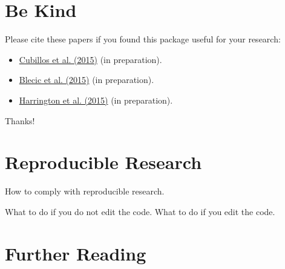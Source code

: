 \documentclass[letterpaper, 12pt]{article}
\begin{document}
\section{Be Kind}
\label{sec:bekind}
Please cite these papers if you found this package useful for your
research:
\begin{itemize}
\item \href{https://github.com/exosports/transit}{Cubillos et
    al. (2015)} (in preparation).

\item \href{https://github.com/dzesmin/}{Blecic et al. (2015)} (in
  preparation).
\item \href{https://github.com/dzesmin/}{Harrington et al. (2015)} (in
  preparation).
\end{itemize}
Thanks!

\section{Reproducible Research}

How to comply with reproducible research.

What to do if you do not edit the code.
What to do if you edit the code.


\section{Further Reading}
\label{sec:furtherreading}

%
\end{document}
